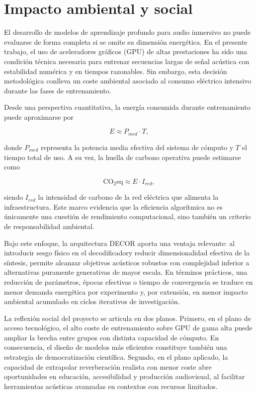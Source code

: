 
\chapter{Impacto ambiental y social}

El desarrollo de modelos de aprendizaje profundo para audio inmersivo no puede evaluarse de forma completa si se omite su dimensión energética. En el presente trabajo, el uso de aceleradores gráficos (GPU) de altas prestaciones ha sido una condición técnica necesaria para entrenar secuencias largas de señal acústica con estabilidad numérica y en tiempos razonables. Sin embargo, esta decisión metodológica conlleva un coste ambiental asociado al consumo eléctrico intensivo durante las fases de entrenamiento.

Desde una perspectiva cuantitativa, la energía consumida durante entrenamiento puede aproximarse por

\begin{equation}
E \approx P_{med}\cdot T,
\end{equation}

donde $P_{med}$ representa la potencia media efectiva del sistema de cómputo y $T$ el tiempo total de uso. A su vez, la huella de carbono operativa puede estimarse como

\begin{equation}
\mathrm{CO_{2}eq} \approx E\cdot I_{red},
\end{equation}

siendo $I_{red}$ la intensidad de carbono de la red eléctrica que alimenta la infraestructura. Este marco evidencia que la eficiencia algorítmica no es únicamente una cuestión de rendimiento computacional, sino también un criterio de responsabilidad ambiental.

Bajo este enfoque, la arquitectura DECOR aporta una ventaja relevante: al introducir sesgo físico en el decodificadory reducir dimensionalidad efectiva de la síntesis, permite alcanzar objetivos acústicos robustos con complejidad inferior a alternativas puramente generativas de mayor escala. En términos prácticos, una reducción de parámetros, épocas efectivas o tiempo de convergencia se traduce en menor demanda energética por experimento y, por extensión, en menor impacto ambiental acumulado en ciclos iterativos de investigación.

La reflexión social del proyecto se articula en dos planos. Primero, en el plano de acceso tecnológico, el alto coste de entrenamiento sobre GPU de gama alta puede ampliar la brecha entre grupos con distinta capacidad de cómputo. En consecuencia, el diseño de modelos más eficientes constituye también una estrategia de democratización científica. Segundo, en el plano aplicado, la capacidad de extrapolar reverberación realista con menor coste abre oportunidades en educación, accesibilidad y producción audiovisual, al facilitar herramientas acústicas avanzadas en contextos con recursos limitados.

